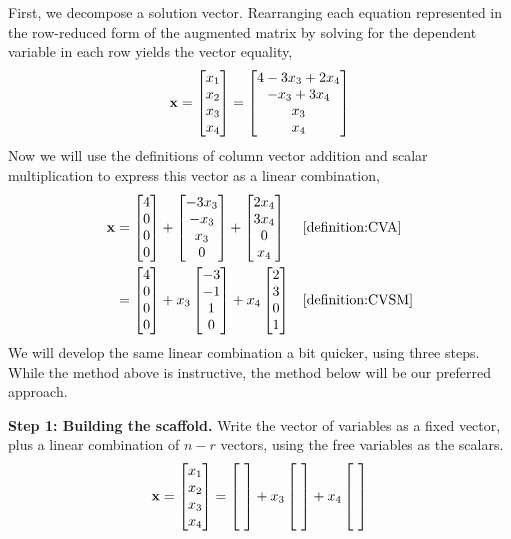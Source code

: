 \documentclass{ximera}
\begin{document}
\begin{example}
  First, we decompose a solution vector.  Rearranging each equation
  represented in the row-reduced form of the augmented matrix by
  solving for the dependent variable in each row yields the vector
  equality,
  \begin{align*}
    \mathbf{x} &= \begin{bmatrix}x_1\\x_2\\x_3\\x_4\end{bmatrix}=
    \begin{bmatrix}4-3x_3+2x_4\\ -x_3+3x_4\\x_3\\x_4\end{bmatrix} \\
  \end{align*}
  Now we will use the definitions of column vector addition and scalar multiplication to express this vector as a linear combination,
\begin{align*}
  \mathbf{x}
                                  &=\begin{bmatrix}4\\0\\0\\0\end{bmatrix}+
    \begin{bmatrix}-3x_3\\-x_3\\x_3\\0\end{bmatrix}+
    \begin{bmatrix}2x_4\\3x_4\\0\\x_4\end{bmatrix}&&\ref{definition:CVA}\\
                                  &=\begin{bmatrix}4\\0\\0\\0\end{bmatrix}+
    x_3\begin{bmatrix}-3\\-1\\1\\0\end{bmatrix}+
    x_4\begin{bmatrix}2\\3\\0\\1\end{bmatrix}&&\ref{definition:CVSM}\\
  \end{align*}
  We will develop the same linear combination a bit quicker, using
  three steps.  While the method above is instructive, the method
  below will be our preferred approach.

  \textbf{Step 1: Building the scaffold.}  Write the vector of variables as a fixed vector,
  plus a linear combination of $n-r$ vectors, using the free variables
  as the scalars.
  \[
    \vect{x}=\colvector{x_1\\x_2\\x_3\\x_4}=
    \colvector{\ \\\ \\\ \\\ }+x_3\colvector{\ \\\ \\\ \\\ }+x_4\colvector{\ \\\ \\\ \\\ }
  \]


\end{example}
\end{document}
